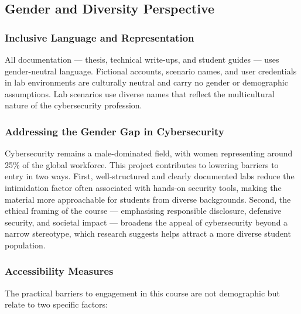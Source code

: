 \subsection{Gender and Diversity Perspective}

\subsubsection{Inclusive Language and Representation}

All documentation --- thesis, technical write-ups, and student guides --- uses
gender-neutral language. Fictional accounts, scenario names, and user credentials
in lab environments are culturally neutral and carry no gender or demographic
assumptions. Lab scenarios use diverse names that reflect the multicultural nature
of the cybersecurity profession.

\subsubsection{Addressing the Gender Gap in Cybersecurity}

Cybersecurity remains a male-dominated field, with women representing around 25\%
of the global workforce\cite{isc2_workforce}. This project contributes to lowering
barriers to entry in two ways. First, well-structured and clearly documented labs
reduce the intimidation factor often associated with hands-on security tools,
making the material more approachable for students from diverse backgrounds.
Second, the ethical framing of the course --- emphasising responsible disclosure,
defensive security, and societal impact --- broadens the appeal of cybersecurity
beyond a narrow stereotype, which research suggests helps attract a more diverse
student population\cite{conti2019}.

\subsubsection{Accessibility Measures}

The practical barriers to engagement in this course are not demographic but relate
to two specific factors:

